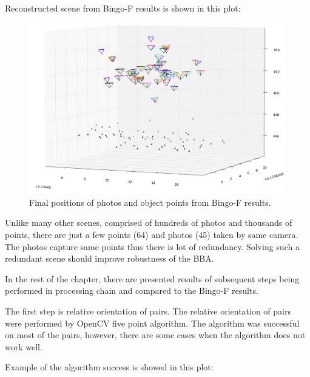 \documentclass[a4paper,12pt]{article}
\begin{document}
Reconstructed  scene from Bingo-F results is shown in this plot:


\begin{center}
 \begin{figure}[!h]
    \includegraphics[scale=0.4]{figures/bingo_result.png}
    \caption{Final positions of photos and object points from Bingo-F results.}
    \label{fig:bingo_result}
\end{figure}
\end{center}

Unlike many other scenes, comprised of hundreds of photos and thousands of points,   
there are just a few points (64) and photos (45) taken by same camera. 
The photos capture same points thus there 
is lot of redundancy. Solving such a redundant scene should improve robustness of the BBA. 

In the rest of the chapter, there are presented results of subsequent steps being performed in processing chain and compared 
to the Bingo-F results.

The first step is relative orientation of pairs. The relative orientation of pairs were performed by OpenCV five point algorithm.
The algorithm was successful on most of the pairs, however, there are some cases when the algorithm does not work well.

Example of the algorithm success is showed in this plot:

\end{document}
